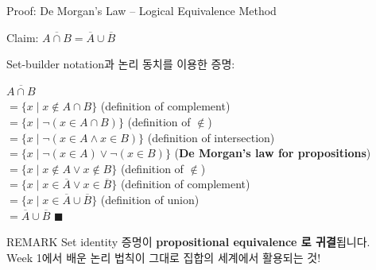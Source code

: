 \documentclass{beamer}
\begin{document}
\begin{frame}[t,shrink=8]{Proof: De Morgan's Law -- Logical Equivalence Method}
    \small
    \vspace{0.05cm}
    \begin{block}{Claim: $\overline{A \cap B} = \overline{A} \cup \overline{B}$}
    \end{block}

    \vspace{0.05cm}
    \footnotesize
    Set-builder notation과 논리 동치를 이용한 증명:

    \vspace{0.1cm}
    \begin{exampleblock}{}
        \scriptsize
        $\overline{A \cap B}$\\[2pt]
        $= \{x \mid x \notin A \cap B\}$ \hfill (definition of complement)\\[2pt]
        $= \{x \mid \neg(x \in A \cap B)\}$ \hfill (definition of $\notin$)\\[2pt]
        $= \{x \mid \neg(x \in A \land x \in B)\}$ \hfill (definition of intersection)\\[2pt]
        $= \{x \mid \neg(x \in A) \lor \neg(x \in B)\}$ \hfill (\textbf{De Morgan's law for propositions})\\[2pt]
        $= \{x \mid x \notin A \lor x \notin B\}$ \hfill (definition of $\notin$)\\[2pt]
        $= \{x \mid x \in \overline{A} \lor x \in \overline{B}\}$ \hfill (definition of complement)\\[2pt]
        $= \{x \mid x \in \overline{A} \cup \overline{B}\}$ \hfill (definition of union)\\[2pt]
        $= \overline{A} \cup \overline{B}$ \hfill $\blacksquare$
    \end{exampleblock}

    \vspace{0.05cm}
    \begin{alertblock}{REMARK}
        \scriptsize Set identity 증명이 \textbf{propositional equivalence 로 귀결}됩니다.\\
        Week 1에서 배운 논리 법칙이 그대로 집합의 세계에서 활용되는 것!
    \end{alertblock}
\end{frame}
\end{document}
